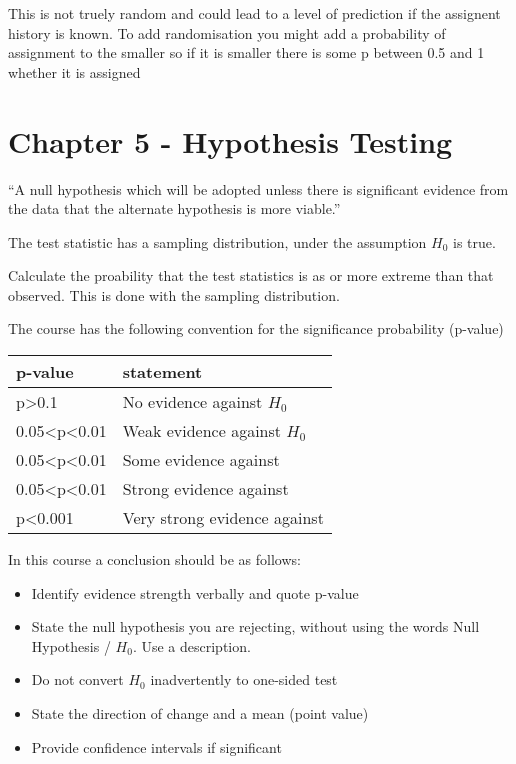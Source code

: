 \documentclass[
  letterpaper,
  DIV=11,
  numbers=noendperiod]{scrreprt}
\providecommand{\tightlist}{%
  \setlength{\itemsep}{0pt}\setlength{\parskip}{0pt}}\usepackage{longtable,booktabs,array}
\begin{document}
This is not truely random and could lead to a level of prediction if the
assignent history is known. To add randomisation you might add a
probability of assignment to the smaller so if it is smaller there is
some p between 0.5 and 1 whether it is assigned

\hypertarget{chapter-5---hypothesis-testing}{%
\section{Chapter 5 - Hypothesis
Testing}\label{chapter-5---hypothesis-testing}}

``A null hypothesis which will be adopted unless there is significant
evidence from the data that the alternate hypothesis is more viable.''

The test statistic has a sampling distribution, under the assumption
\(H_0\) is true.

Calculate the proability that the test statistics is as or more extreme
than that observed. This is done with the sampling distribution.

The course has the following convention for the significance probability
(p-value)

\begin{longtable}[]{@{}ll@{}}
\toprule()
p-value & statement \\
\midrule()
\endhead
p\textgreater0.1 & No evidence against \(H_0\) \\
0.05\textless p\textless0.01 & Weak evidence against \(H_0\) \\
0.05\textless p\textless0.01 & Some evidence against \\
0.05\textless p\textless0.01 & Strong evidence against \\
p\textless0.001 & Very strong evidence against \\
\bottomrule()
\end{longtable}

In this course a conclusion should be as follows:

\begin{itemize}
\tightlist
\item
  Identify evidence strength verbally and quote p-value
\item
  State the null hypothesis you are rejecting, without using the words
  Null Hypothesis / \(H_0\). Use a description.
\item
  Do not convert \(H_0\) inadvertently to one-sided test
\item
  State the direction of change and a mean (point value)
\item
  Provide confidence intervals if significant
\end{itemize}
\end{document}
